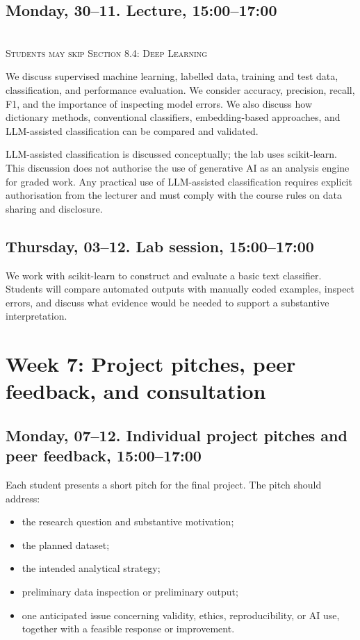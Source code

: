 \subsection*{Monday, 30--11. Lecture, 15:00--17:00}

\\
\textsc{ Students may skip Section 8.4: Deep Learning}\\

We discuss supervised machine learning, labelled data, training and test data, classification, and performance evaluation. We consider accuracy, precision, recall, F1, and the importance of inspecting model errors. We also discuss how dictionary methods, conventional classifiers, embedding-based approaches, and LLM-assisted classification can be compared and validated.

LLM-assisted classification is discussed conceptually; the lab uses scikit-learn. This discussion does not authorise the use of generative AI as an analysis engine for graded work. Any practical use of LLM-assisted classification requires explicit authorisation from the lecturer and must comply with the course rules on data sharing and disclosure.

\subsection*{Thursday, 03--12. Lab session, 15:00--17:00}

We work with scikit-learn to construct and evaluate a basic text classifier. Students will compare automated outputs with manually coded examples, inspect errors, and discuss what evidence would be needed to support a substantive interpretation.


\section*{Week 7: Project pitches, peer feedback, and consultation}

\subsection*{Monday, 07--12. Individual project pitches and peer feedback, 15:00--17:00}

Each student presents a short pitch for the final project. The pitch should address:
\begin{itemize}
    \item the research question and substantive motivation;
    \item the planned dataset;
    \item the intended analytical strategy;
    \item preliminary data inspection or preliminary output;
    \item one anticipated issue concerning validity, ethics, reproducibility, or AI use, together with a feasible response or improvement.
\end{itemize}

